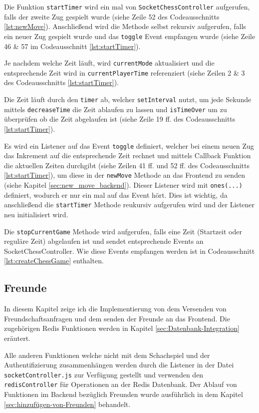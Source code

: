 Die Funktion \verb|startTimer| wird ein mal von \verb|SocketChessController| aufgerufen, falls der zweite Zug gespielt wurde (siehe Zeile 52 des Codeausschnitts \ref{lst:newMove}). Anschließend wird die Methode selbst rekursiv aufgerufen, falls ein neuer Zug gespielt wurde und das \verb|toggle| Event empfangen wurde (siehe Zeile 46 \& 57 im Codeausschnitt \ref{lst:startTimer}).

Je nachdem welche Zeit läuft, wird \verb|currentMode| aktualisiert und die entsprechende Zeit wird in \verb|currentPlayerTime| referenziert (siehe Zeilen 2 \& 3 des Codeausschnitts \ref{lst:startTimer}).

Die Zeit läuft durch den \verb|timer| ab, welcher \verb|setInterval| nutzt, um jede Sekunde mittels \verb|decreaseTime| die Zeit ablaufen zu lassen und \verb|isTimeOver| um zu überprüfen ob die Zeit abgelaufen ist (siehe Zeile 19 ff. des Codeausschnitts \ref{lst:startTimer}).

Es wird ein Listener auf das Event \verb|toggle| definiert, welcher bei einem neuen Zug das Inkrement auf die entsprechende Zeit rechnet und mittels Callback Funktion die aktuellen Zeiten durchgibt (siehe Zeilen 41 ff. und 52 ff. des Codeausschnitts \ref{lst:startTimer}), um diese in der \verb|newMove| Methode an das Frontend zu senden (siehe Kapitel \ref{sec:new_move_backend}). Dieser Listener wird mit \verb|ones(...)| definiert, wodurch er nur ein mal auf das Event hört. Dies ist wichtig, da anschließend die \verb|startTimer| Methode reukursiv aufgerufen wird und der Listener neu initialisiert wird.

Die \verb|stopCurrentGame| Methode wird aufgerufen, falls eine Zeit (Startzeit oder reguläre Zeit) abgelaufen ist und sendet entsprechende Events an SocketChessController. Wie diese Events empfangen werden ist in Codeausschnitt \ref{lst:createChessGame} enthalten.


\subsection{Freunde}
In diesem Kapitel zeige ich die Implementierung von dem Versenden von Freundschaftsanfragen und dem senden der Freunde an das Frontend. Die zugehörigen Redis Funktionen werden in Kapitel \ref{sec:Datenbank-Integration} eräutert.

Alle anderen Funktionen welche nicht mit dem Schachspiel und der Authentifizierung zusammenhängen werden durch die Listener in der Datei \verb|socketController.js| zur Verfügung gestellt und verwenden den \verb|redisController| für Operationen an der Redis Datenbank. Der Ablauf von Funktionen im Backend bezüglich Freunden wurde ausführlich in dem Kapitel \ref{sec:hinzufügen-von-Freunden} behandelt.

